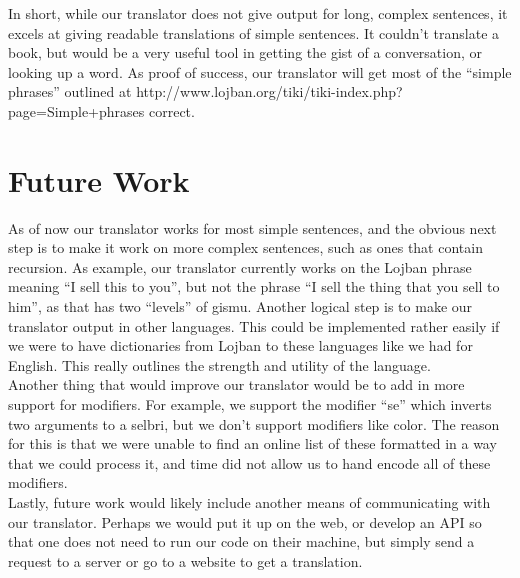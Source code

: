 \documentclass[11pt,letterpaper]{article}
\begin{document}
In short, while our translator does not give output for long, complex sentences, it excels at giving readable translations of simple sentences.  It couldn’t translate a book, but would be a very useful tool in getting the gist of a conversation, or looking up a word.  As proof of success, our translator will get most of the “simple phrases” outlined at http://www.lojban.org/tiki/tiki-index.php?page=Simple+phrases correct.  \\

\section{Future Work} 
As of now our translator works for most simple sentences, and the obvious next step is to make it work on more complex sentences, such as ones that contain recursion.  As example, our translator currently works on the Lojban phrase meaning “I sell this to you”, but not the phrase “I sell the thing that you sell to him”, as that has two “levels” of gismu.  Another logical step is to make our translator output in other languages.  This could be implemented rather easily if we were to have dictionaries from Lojban to these languages like we had for English.  This really outlines the strength and utility of the language.  \\
	Another thing that would improve our translator would be to add in more support for modifiers.  For example, we support the modifier “se” which inverts two arguments to a selbri, but we don’t support modifiers like color.  The reason for this is that we were unable to find an online list of these formatted in a way that we could process it, and time did not allow us to hand encode all of these modifiers.  \\
	Lastly, future work would likely include another means of communicating with our translator.  Perhaps we would put it up on the web, or develop an API so that one does not need to run our code on their machine, but simply send a request to a server or go to a website to get a translation.  \\
\end{document}
